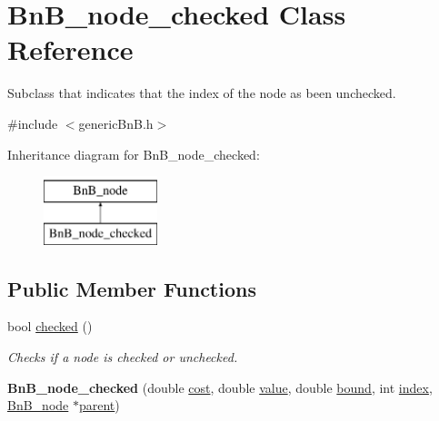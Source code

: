\hypertarget{class_bn_b__node__checked}{}\section{Bn\+B\+\_\+node\+\_\+checked Class Reference}
\label{class_bn_b__node__checked}


Subclass that indicates that the index of the node as been unchecked.  




{\ttfamily \#include $<$generic\+Bn\+B.\+h$>$}

Inheritance diagram for Bn\+B\+\_\+node\+\_\+checked\+:\begin{figure}[H]
\begin{center}
\leavevmode
\includegraphics[height=2.000000cm]{class_bn_b__node__checked}
\end{center}
\end{figure}
\subsection*{Public Member Functions}
\begin{DoxyCompactItemize}
\item 
bool \hyperlink{class_bn_b__node__checked_ab4f7550e430ffa2451386045a4dce9f8}{checked} ()
\begin{DoxyCompactList}\small\item\em Checks if a node is checked or unchecked. \end{DoxyCompactList}\item 
\hypertarget{class_bn_b__node__checked_ae0c755ab3273803bc467d9feb0670646}{}{\bfseries Bn\+B\+\_\+node\+\_\+checked} (double \hyperlink{class_bn_b__node_a6a44afc83f3d0c1601804b61cf03fbf1}{cost}, double \hyperlink{class_bn_b__node_a726b74bbceb33532ee8678e0722d62aa}{value}, double \hyperlink{class_bn_b__node_a275b8c6f02b922e74a7f82d8fb3b5cf9}{bound}, int \hyperlink{class_bn_b__node_a531520424d5cc944a542a984cc14f32f}{index}, \hyperlink{class_bn_b__node}{Bn\+B\+\_\+node} $\ast$\hyperlink{class_bn_b__node_ac70c63a5ed68adefb9bc9540ac8e68dd}{parent})\label{class_bn_b__node__checked_ae0c755ab3273803bc467d9feb0670646}

\end{DoxyCompactItemize}
